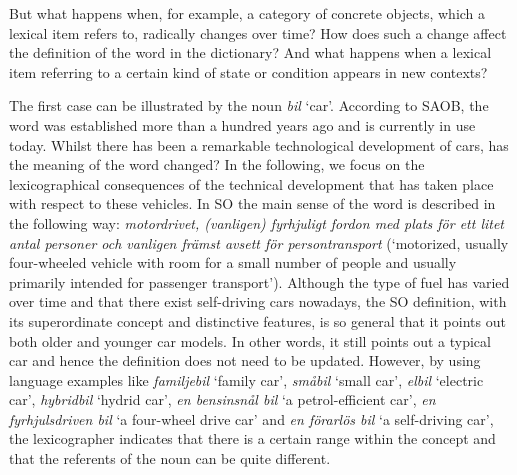 \documentclass[output=paper]{langscibook}
\begin{document}
But what happens when, for example, a category of concrete objects, which a lexical item refers to, radically changes over time? How does such a change affect the definition of the word in the dictionary? And what happens when a lexical item referring to a certain kind of state or condition appears in new contexts? 

The first case can be illustrated by the noun \emph{bil} `car'. According to SAOB, the word was established more than a hundred years ago and is currently in use today. Whilst there has been a remarkable technological development of cars, has the meaning of the word changed? In the following, we focus on  the lexicographical consequences of the technical development that has taken place with respect to these vehicles. In SO the main sense of the word is described in the following way: \textit{motordrivet, (vanligen) fyrhjuligt fordon med plats för ett litet antal personer och vanligen främst avsett för persontransport} (`motorized, usually four-wheeled vehicle with room for a small number of people and usually primarily intended for passenger transport'). Although the type of fuel has varied over time and that there exist self-driving cars nowadays, the SO definition, with its superordinate concept and distinctive features, is so general that it points out both older and younger car models. In other words, it still points out a typical car and hence the definition does not need to be updated. However, by using language examples like \emph{familjebil} `family car', \emph{småbil} `small car', \emph{elbil} `electric car', \emph{hybridbil} `hydrid car', \emph{en bensinsnål bil} `a petrol-efficient car', \emph{en fyrhjulsdriven bil} `a four-wheel drive car' and \emph{en förarlös bil} `a self-driving car', the lexicographer indicates that there is a certain range within the concept and that the referents of the noun can be quite different.
\end{document}
